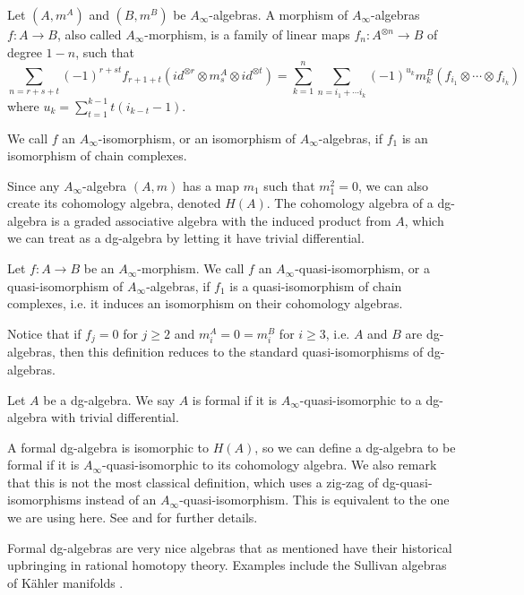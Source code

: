\begin{definition}
    Let $(A, m^A)$ and $(B, m^B)$ be $A_\infty$-algebras. A morphism of 
    $A_\infty$-algebras $f:A\longrightarrow B$, also called $A_\infty$-morphism, is a 
    family of linear maps $f_n:A^{\otimes n}\longrightarrow B$ of degree $1-n$, such that
    $$\sum_{n = r+s+t}(-1)^{r+st}f_{r+1+t}(id^{\otimes r}\otimes m_s^A \otimes id^{\otimes t}) = \sum_{k=1}^{n}\sum_{n=i_1+\cdots i_k}(-1)^{u_k} m_k^B(f_{i_1}\otimes \cdots \otimes f_{i_k})$$
    where $u_k=\displaystyle \sum_{t=1}^{k-1}t(i_{k-t}-1)$.     
\end{definition}

We call $f$ an $A_\infty$-isomorphism, or an isomorphism of $A_\infty$-algebras, if $f_1$ 
is an isomorphism of chain complexes.

Since any $A_\infty$-algebra $(A, m)$ has a map $m_1$ such that $m_1^2=0$, we can also 
create its cohomology algebra, denoted $H(A)$. The cohomology algebra of a dg-algebra 
is a graded associative algebra with the induced product from $A$, which we can treat as 
a dg-algebra by letting it have trivial differential.

Let $f:A\longrightarrow B$ be an $A_\infty$-morphism. We call $f$ an 
$A_\infty$-quasi-isomorphism, or a quasi-isomorphism of $A_\infty$-algebras, if $f_1$ is 
a quasi-isomorphism of chain complexes, i.e. it induces an isomorphism on their cohomology 
algebras.

Notice that if $f_j=0$ for $j\geq 2$ and $m^A_i = 0 = m^B_i$ for $i\geq 3$, i.e. $A$ and 
$B$ are dg-algebras, then this definition reduces to the standard quasi-isomorphisms of 
dg-algebras.

\begin{definition}
    Let $A$ be a dg-algebra. We say $A$ is formal if it is 
    $A_\infty$-quasi-isomorphic to a dg-algebra with trivial differential.        
\end{definition}

A formal dg-algebra is isomorphic to $H(A)$, so we can define a dg-algebra to be 
formal if it is $A_\infty$-quasi-isomorphic to its cohomology algebra. We also remark 
that this is not the most classical definition, which uses a zig-zag of 
dg-quasi-isomorphisms instead of an $A_\infty$-quasi-isomorphism. This is equivalent 
to the one we are using here. See \cite{AHO} and \cite{keller} for further details. 

Formal dg-algebras are very nice algebras that as mentioned have their historical 
upbringing in rational homotopy theory. Examples include the Sullivan algebras of 
Kähler manifolds \cite{DGMS}.